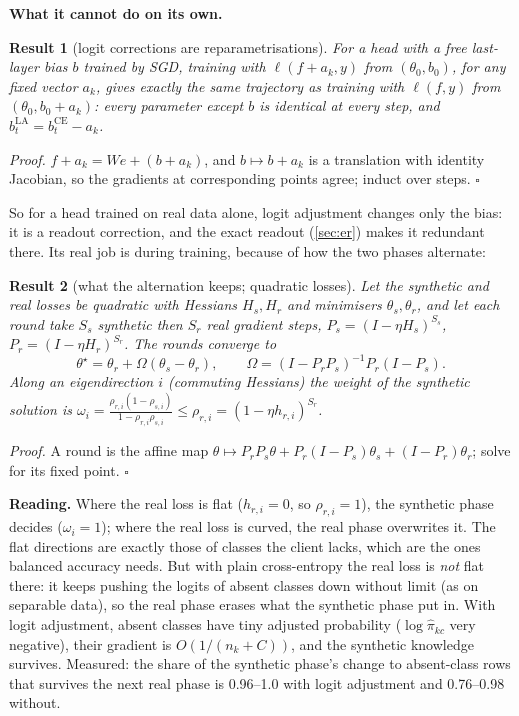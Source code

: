 \documentclass[11pt]{article}
\theoremstyle{plain}
\newtheorem{result}{Result}
\theoremstyle{definition}
\begin{document}
\textbf{What it cannot do on its own.}

\begin{result}[logit corrections are reparametrisations]\label{res:reparam}
For a head with a free last-layer bias $b$ trained by SGD, training with $\ell(f+a_k,y)$ from $(\theta_0,b_0)$, for any
fixed vector $a_k$, gives exactly the same trajectory as training with $\ell(f,y)$ from $(\theta_0,b_0+a_k)$: every
parameter except $b$ is identical at every step, and $b^{\mathrm{LA}}_t=b^{\mathrm{CE}}_t-a_k$.
\end{result}
\emph{Proof.} $f+a_k=We+(b+a_k)$, and $b\mapsto b+a_k$ is a translation with identity Jacobian, so the gradients at
corresponding points agree; induct over steps. $\square$

So for a head trained on real data alone, logit adjustment changes only the bias: it is a readout correction, and the
exact readout (\cref{sec:er}) makes it redundant there. Its real job is during training, because of how the two phases
alternate:

\begin{result}[what the alternation keeps; quadratic losses]\label{res:alternation}
Let the synthetic and real losses be quadratic with Hessians $H_s,H_r$ and minimisers $\theta_s,\theta_r$, and let each
round take $S_s$ synthetic then $S_r$ real gradient steps, $P_s=(I-\eta H_s)^{S_s}$, $P_r=(I-\eta H_r)^{S_r}$. The rounds
converge to
\[
\theta^\star=\theta_r+\Omega(\theta_s-\theta_r),\qquad\Omega=(I-P_rP_s)^{-1}P_r(I-P_s).
\]
Along an eigendirection $i$ (commuting Hessians) the weight of the synthetic solution is
$\omega_i=\frac{\rho_{r,i}(1-\rho_{s,i})}{1-\rho_{r,i}\rho_{s,i}}\le\rho_{r,i}=(1-\eta h_{r,i})^{S_r}$.
\end{result}
\emph{Proof.} A round is the affine map $\theta\mapsto P_rP_s\theta+P_r(I-P_s)\theta_s+(I-P_r)\theta_r$; solve for its
fixed point. $\square$

\textbf{Reading.} Where the real loss is flat ($h_{r,i}=0$, so $\rho_{r,i}=1$), the synthetic phase decides
($\omega_i=1$); where the real loss is curved, the real phase overwrites it. The flat directions are exactly those of
classes the client lacks, which are the ones balanced accuracy needs. But with plain cross-entropy the real loss is
\emph{not} flat there: it keeps pushing the logits of absent classes down without limit (as on separable data), so the
real phase erases what the synthetic phase put in. With logit adjustment, absent classes have tiny adjusted
probability ($\log\hat\pi_{kc}$ very negative), their gradient is $O(1/(n_k+C))$, and the synthetic knowledge
survives. Measured: the share of the synthetic phase's change to absent-class rows that survives the next real phase is
0.96--1.0 with logit adjustment and 0.76--0.98 without.
\end{document}
